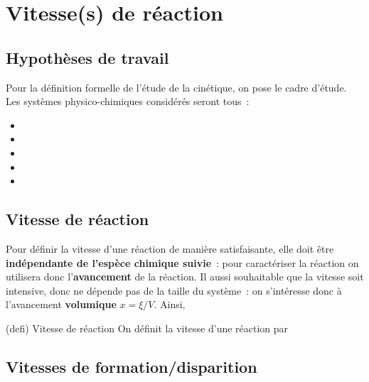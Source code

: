 \documentclass[../../main/main.tex]{subfiles}
\begin{document}
\section{Vitesse(s) de réaction}
\subsection{Hypothèses de travail}
Pour la définition formelle de l'étude de la cinétique, on pose le cadre
d'étude. Les systèmes physico-chimiques considérés seront tous~:
\begin{itemize}
	\item {}
	\item {}
	\item {}
	\item {}
	\item {}
\end{itemize}

\subsection{Vitesse de réaction}

Pour définir la vitesse d'une réaction de manière satisfaisante, elle doit être
\textbf{indépendante de l'espèce chimique suivie}~: pour caractériser la
réaction on utilisera donc l'\textbf{avancement} de la réaction. Il aussi
souhaitable que la vitesse soit intensive, donc ne dépende pas de la taille du
système~: on s'intéresse donc à l'avancement \textbf{volumique} $x = \xi/V$.
Ainsi,
\begin{tcb}[label=def:vreac, sidebyside, righthand ratio=.3](defi)
	{Vitesse de réaction}
	On définit la vitesse d'une réaction par
	\psw{
		\[\boxed{
				v\ftn{
					On trouve aussi parfois la notation $r$ pour la vitesse, pour la
					différencier de la vitesse en mécanique et ne pas confondre $x$ avec
					la position d'un corps massique.
				}
				= \dv{x}{t}} \qavec \boxed{x = \frac{\xi}{V}}\]
	}
	\tcblower
\end{tcb}

\subsection{Vitesses de formation/disparition}
\end{document}
